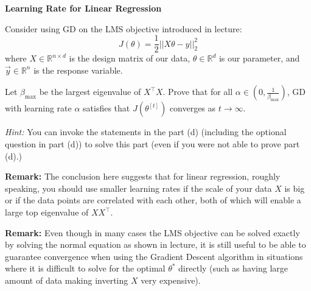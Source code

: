 \item {} {\bf Learning Rate for Linear Regression}

Consider using GD on the LMS objective introduced in lecture:
\begin{equation*}
	J(\theta) = \frac{1}{2}||X\theta - y||_2^2
\end{equation*}
where $X\in\mathbb{R}^{n\times d}$ is the design matrix of our data, $\theta\in\mathbb{R}^d$ is our parameter, and $\vec{y}\in\mathbb{R}^n$  is the response variable. 

Let $\beta_{\max}$ be the largest eigenvalue of $X^\top X$. Prove that for all  $\alpha \in (0, \frac{1}{\beta_{\max}})$, GD with learning rate $\alpha$ satisfies that $J(\theta^{[t]})$ converges as $t\rightarrow \infty.$
	
\textit{Hint:}	You can invoke the statements in the part (d) (including the optional question in part (d)) to solve this part (even if you were not able to prove part (d).)

\textbf{Remark:} The conclusion here suggests that for linear regression, roughly speaking, you should use smaller learning rates if the scale of your data $X$ is big or if the data points are correlated with each other, both of which will enable a large top eigenvalue of $XX^\top$.

\textbf{Remark:} Even though in many cases the LMS objective can be solved 
exactly by solving the normal equation as shown in lecture, it is still useful to be able to guarantee convergence
when using the Gradient Descent algorithm in situations where it is difficult to solve
for the optimal $\theta^*$ directly (such as having large amount of data making inverting $X$
very expensive).
